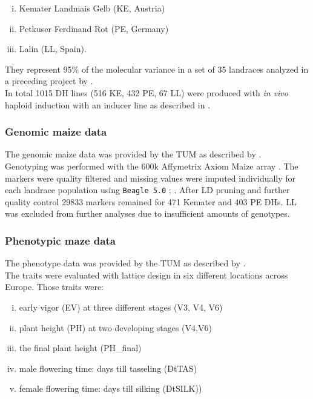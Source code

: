 \begin{enumerate}[(i)]
\item Kemater Landmais Gelb (KE, Austria)
\item Petkuser Ferdinand Rot (PE, Germany)
\item Lalin (LL, Spain).
\end{enumerate}

They represent 95\% of the molecular variance in a set of
35 landraces analyzed in a preceding project by \cite{mayer2017there}.\\
In total 1015 DH lines (516 KE, 432 PE, 67 LL) were produced with \textit{in vivo} haploid
induction with an inducer line as described in \cite{roeber2005vivo}.


\subsubsection{Genomic maize data}
The genomic maize data was provided by the TUM as described by \cite{holker2019european}.\\
Genotyping was performed with the 600k Affymetrix\textsuperscript{\textregistered}
Axiom\textsuperscript{\textregistered} Maize array \cite{unterseer2014powerful}. The
markers were quality filtered and missing values were imputed individually for each
landrace population using \texttt{Beagle 5.0} \cite{browning2007rapid};
\cite{browning2018one}. After LD pruning and further quality control 29833 markers
remained for 471 Kemater and 403 PE DHs. LL was excluded from further analyses due to
insufficient amounts of genotypes.

\subsubsection{Phenotypic maze data}
The phenotype data was provided by the TUM as described by \cite{holker2019european}. \\
The traits were evaluated with lattice design in six different locations across
Europe. Those traits were:

\begin{enumerate}[(i)]
\item early vigor (EV) at three different stages (V3, V4, V6)
\item plant height (PH) at two developing stages (V4,V6)
\item the final plant height (PH\_final)
\item male flowering time: days till tasseling (DtTAS)
\item female flowering time: days till silking (DtSILK)) 
\end{enumerate}

